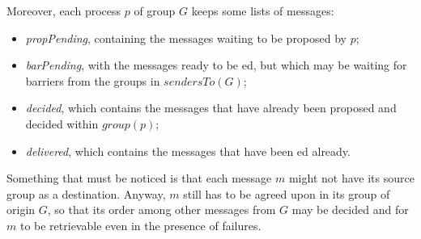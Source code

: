 \documentclass[times, 10pt]{article}
\begin{document}
Moreover, each process $p$ of group $G$ keeps some lists of messages:
\begin{itemize}
  \item \textit{propPending}, containing the messages waiting to be proposed by $p$;
  \item \textit{barPending}, with the messages ready to be \cons{}ed, but which may be waiting for barriers from the groups in $sendersTo(G)$;
  \item \textit{decided}, which contains the messages that have already been proposed and decided within $group(p)$;
  \item \textit{delivered}, which contains the messages that have been \cons{}ed already.
\end{itemize} 


Something that must be noticed is that each message $m$ might not have its source group as a destination. Anyway, $m$ still has to be agreed upon in its group of origin $G$, so that its order among other messages from $G$ may be decided and for %
$m$ to be retrievable even in the presence of failures.%
\end{document}
